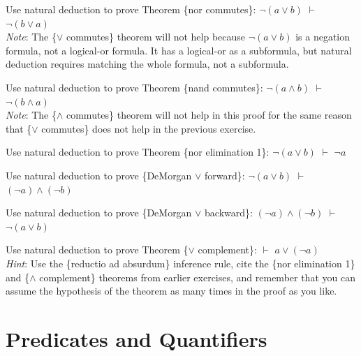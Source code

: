 {{\begin{ExerciseList}
\Exercise
Use natural deduction to prove
Theorem
\{nor commutes\}: $\neg (a \vee b)$ $\vdash$ $\neg (b \vee a)$\\
\emph{Note}: The \{$\vee$ commutes\} theorem will not help because
$\neg (a \vee b)$ is a negation formula, not a logical-or formula.
It has a logical-or as a subformula, but natural deduction
requires matching the whole formula, not a subformula.

\Exercise
Use natural deduction to prove
Theorem
 \{nand commutes\}: $\neg (a \wedge b)$ $\vdash$ $\neg (b \wedge a)$\\
\emph{Note}: The \{$\wedge$ commutes\} theorem will not help in this proof
for the same reason that \{$\vee$ commutes\} does not help
in the previous exercise.

\Exercise
Use natural deduction to prove
Theorem
\{nor elimination 1\}: $\neg (a \vee b)$ $\vdash$ $\neg a$

\Exercise
Use natural deduction to prove
\{DeMorgan $\vee$ forward\}:
$\neg (a \vee b)$ $\vdash$ $(\neg a) \wedge (\neg b)$

\Exercise
Use natural deduction to prove
\{DeMorgan $\vee$ backward\}:
$(\neg a) \wedge (\neg b)$ $\vdash$ $\neg (a \vee b)$

\Exercise
Use natural deduction to prove
Theorem \{$\vee$ complement\}: $\vdash$ $a \vee (\neg a)$ \\
\emph{Hint}: Use the \{reductio ad absurdum\} inference rule,
cite the \{nor elimination 1\} and \{$\wedge$ complement\}
theorems from earlier exercises,
and remember that you can assume the hypothesis
of the theorem as many times in the proof as you like.

\end{ExerciseList}


\section{Predicates and Quantifiers}
\label{sec:predicates-and-quantifiers}

}}
